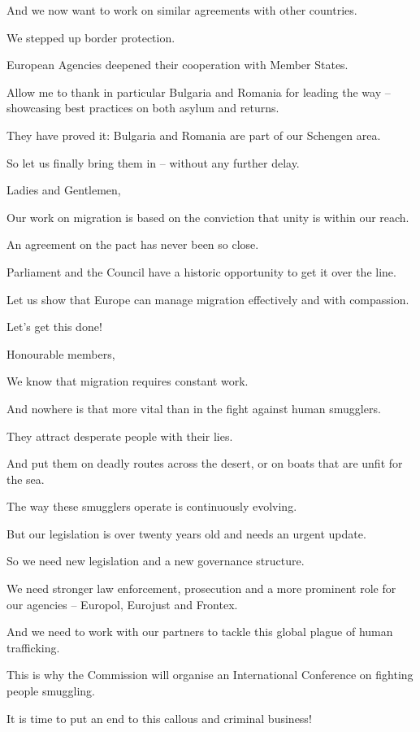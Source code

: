 \documentclass[a4paper,11pt]{article}
\begin{document}
And we now want to work on similar agreements with other countries.

We stepped up border protection.

European Agencies deepened their cooperation with Member States.

Allow me to thank in particular Bulgaria and Romania for leading the way – showcasing best practices on both asylum and returns.

They have proved it: Bulgaria and Romania are part of our Schengen area.

So let us finally bring them in – without any further delay.

 

Ladies and Gentlemen,

Our work on migration is based on the conviction that unity is within our reach.

An agreement on the pact has never been so close.

Parliament and the Council have a historic opportunity to get it over the line.

Let us show that Europe can manage migration effectively and with compassion.

Let's get this done!

 

Honourable members,

We know that migration requires constant work.

And nowhere is that more vital than in the fight against human smugglers.

They attract desperate people with their lies.

And put them on deadly routes across the desert, or on boats that are unfit for the sea.

The way these smugglers operate is continuously evolving.

But our legislation is over twenty years old and needs an urgent update.

So we need new legislation and a new governance structure.

We need stronger law enforcement, prosecution and a more prominent role for our agencies – Europol, Eurojust and Frontex.

And we need to work with our partners to tackle this global plague of human trafficking.

This is why the Commission will organise an International Conference on fighting people smuggling.

It is time to put an end to this callous and criminal business!
\end{document}
